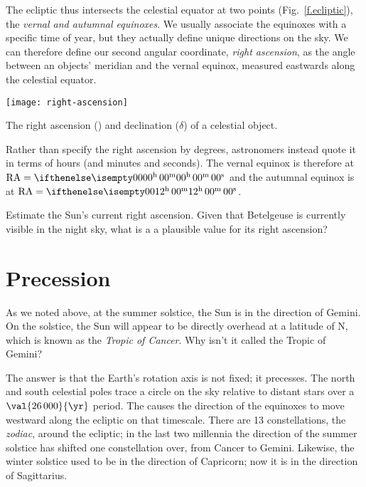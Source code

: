 The ecliptic thus intersects the celestial equator at two points (Fig.~\ref{f.ecliptic}), the \emph{vernal and autumnal equinoxes}. We usually associate the equinoxes with a specific time of year, but they actually define unique directions on the sky. We can therefore define our second angular coordinate, \emph{right ascension}, as the angle between an objects' meridian and the vernal equinox, measured eastwards along the celestial equator.

\begin{marginfigure}
\texttt{[image: right-ascension]}
\caption[Right ascension and declination]{The right ascension (\RA) and declination ($\delta$) of a celestial object.}
\label{f.right-ascension}
\end{marginfigure}

Rather than specify the right ascension by degrees, astronomers instead quote it in terms of hours (and minutes and seconds).  The vernal equinox is therefore at $\RA = \hrangle{00}{00}{00}$ and the autumnal equinox is at $\RA = \hrangle{12}{00}{00}$.

\begin{exercisebox}
Estimate the Sun's current right ascension.  Given that Betelgeuse is currently visible in the night sky, what is a a plausible value for its right ascension?
\label{ex.RA-sun}
\end{exercisebox}

\section{Precession}
As we noted above, at the summer solstice, the Sun is in the direction of Gemini. On the solstice, the Sun will appear to be directly overhead at a latitude of N, which is known as the \emph{Tropic of Cancer}.  Why isn't it called the Tropic of Gemini?

The answer is that the Earth's rotation axis is not fixed; it precesses. The north and south celestial poles trace a circle on the sky relative to distant stars over a $\val{26\,000}{\yr}$ period. The causes the direction of the equinoxes to move westward along the ecliptic on that timescale.  There are 13 constellations, the \emph{zodiac}, around the ecliptic; in the last two millennia the direction of the summer solstice has shifted one constellation over, from Cancer to Gemini.  Likewise, the winter solstice used to be in the direction of Capricorn; now it is in the direction of Sagittarius.

